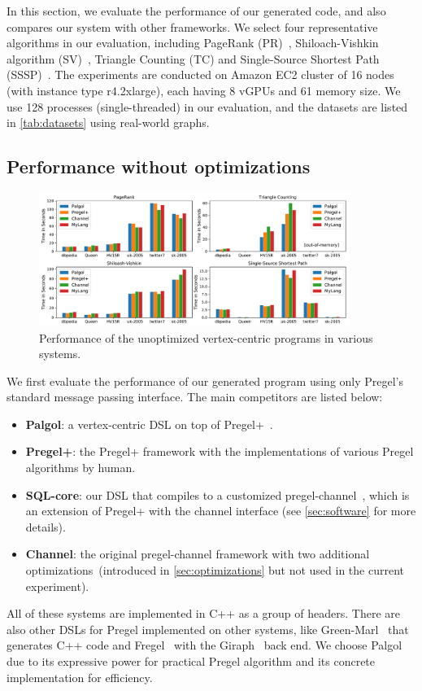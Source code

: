 \documentclass{sokendai_thesis} %
\begin{document}
In this section, we evaluate the performance of our generated code, and also compares our system with other frameworks.
We select four representative algorithms in our evaluation, including PageRank (PR)~\cite{google,pregel}, Shiloach-Vishkin algorithm (SV)~\cite{ShVi82,yan2015effective}, Triangle Counting (TC) and Single-Source Shortest Path (SSSP)~\cite{pregel}.
The experiments are conducted on Amazon EC2 cluster of 16 nodes (with instance type r4.2xlarge), each having 8 vGPUs and 61 memory size.
We use 128 processes (single-threaded) in our evaluation, and the datasets are listed in \autoref{tab:datasets} using real-world graphs.

\subsection{Performance without optimizations}

\begin{figure}
\centering
\includegraphics[width=0.9\textwidth]{figures/performance.pdf}
\caption{Performance of the unoptimized vertex-centric programs in various systems.}
\label{fig:performance}
\end{figure}

We first evaluate the performance of our generated program using only Pregel's standard message passing interface.
The main competitors are listed below:
\begin{itemize}
  \item \textbf{Palgol}: a vertex-centric DSL on top of Pregel+~\cite{yan2015effective}.
  \item \textbf{Pregel+}: the Pregel+ framework with the implementations of various Pregel algorithms by human.
  \item \textbf{SQL-core}: our DSL that compiles to a customized pregel-channel~\cite{zhang2019composing}, which is an extension of Pregel+ with the channel interface (see \autoref{sec:software} for more details).
  \item \textbf{Channel}: the original pregel-channel framework with two additional optimizations~(introduced in \autoref{sec:optimizations} but not used in the current experiment).
\end{itemize}
All of these systems are implemented in C++ as a group of headers.
There are also other DSLs for Pregel implemented on other systems, like Green-Marl~\cite{green14} that generates C++ code and Fregel~\cite{fregel} with the Giraph~\cite{giraph} back end.
We choose Palgol due to its expressive power for practical Pregel algorithm and its concrete implementation for efficiency.
\end{document}
